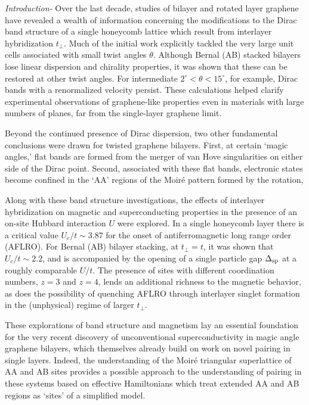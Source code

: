 \documentclass[%
 reprint,
 amsmath,amssymb,
 aps,
]{revtex4-1}
\begin{document}
\textit{Introduction-}
Over the last decade, studies of bilayer and rotated layer graphene have
revealed a wealth of information concerning the modifications to the
Dirac band structure of a single honeycomb lattice which result from
interlayer hybridization $t_\perp$.
Much of the initial work\cite{bistrizer10,dalaissardiere12,
dalaissardiere10}
explicitly tackled the very large
unit cells associated with small twist angles $\theta$.
Although Bernal (AB) stacked bilayers
lose linear dispersion and
chirality properties, it was shown that these can be restored at
other twist angles.  For intermediate
$2^\circ < \theta < 15^\circ$, for example, Dirac bands with a
renormalized velocity persist.  These calculations helped clarify
experimental observations of graphene-like properties even in
materials with large numbers of
planes\cite{emtsev08,sprinkle09,hicks11,miller09,berger06,sadowski06},
far from the single-layer graphene limit.

Beyond the continued presence of Dirac dispersion, two other
fundamental conclusions were drawn for twisted
graphene bilayers.  First, at certain `magic angles,'
flat bands are formed from the
merger of van Hove singularities on either side of
the Dirac point\cite{dalaissardiere12}.
Second, associated with these flat bands, electronic
states become confined in the
`AA' regions of the Moir\'e pattern formed by the rotation,

Along with these band structure investigations, the effects of
interlayer hybridization on magnetic and superconducting
properties in the presence of an
on-site Hubbard interaction $U$ were
explored\cite{gilbert09,lang12,pujari16,tao14,tang17}.  In a single honeycomb
layer there is a critical value $U_c/t \sim 3.87$\cite{paiva05,otsuka16}
for the onset of antiferromagnetic long range order (AFLRO).  For Bernal
(AB) bilayer stacking, at $t_\perp=t$, it was shown that $U_c/t \sim
2.2$\cite{lang12}, and is accompanied by the opening of a single
particle gap
$\Delta_{\rm sp}$ at a roughly comparable $U/t$.  The presence of sites
with different coordination numbers, $z=3$ and $z=4$, lends an
additional
richness to the magnetic behavior, as does the possibility of quenching
AFLRO through interlayer singlet formation in the (unphysical) regime of
larger $t_\perp$.

These explorations of band structure and magnetism lay an essential
foundation for the very recent discovery of unconventional
superconductivity in magic angle graphene
bilayers\cite{cao18a,cao18b},
which themselves already build on work on novel
pairing in single layers\cite{nandkishore12,baskaran10}.
Indeed, the understanding of the Moir\'e triangular superlattice
of AA and AB sites provides a possible approach to the
understanding of pairing in these systems based on
effective Hamiltonians which treat extended AA and AB regions as `sites'
of a simplified model.
\end{document}
